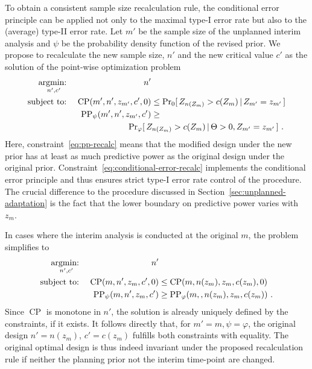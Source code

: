 \documentclass{article}
\renewcommand{\Pr}{\operatorname{Pr}}
\newcommand{\st}{\operatorname{subject\ to:\ }}
\newcommand{\argmin}[1]{\operatornamewithlimits{argmin:\ }_{#1}}
\newcommand{\CP}{\ensuremath{\operatorname{CP}}}
\newcommand{\PP}{\ensuremath{\operatorname{PP}}}
\renewcommand{\Pr}{\ensuremath{\operatorname{Pr}}}
\newcommand{\cond}{\ensuremath{\,|\,}}
\begin{document}
To obtain a consistent sample size recalculation rule, 
the conditional error principle can be applied not only to the
maximal type-I error rate but also to the (average) type-II error rate.
Let $m'$ be the sample size of the unplanned interim analysis and
$\psi$ be the probability density function of the revised prior.
We propose to recalculate the new sample size, $n'$ and 
the new critical value $c'$ as the solution of the point-wise optimization problem 
\begin{align}
    \argmin{n',c'} && n' &\\
     \st && \CP(m', n', z_{m'}, c', 0) &\leq \Pr_0[\,Z_{n(Z_m)} > c(Z_m) \cond Z_{m'} = z_{m'}\,] \label{eq:conditional-error-recalc}\\
     && \PP_\psi(m', n', z_{m'}, c') &\geq \nonumber \\ 
     && & \hspace*{-1cm}\Pr_\varphi[\,Z_{n(Z_m)} > c(Z_m) \cond \Theta >0, Z_{m'} = z_{m'}\,] \label{eq:pp-recalc} \ .
\end{align}
Here, constraint~\eqref{eq:pp-recalc} means that the modified design under the new prior has at least as much predictive power as the original design under the original prior. 
Constraint~\eqref{eq:conditional-error-recalc} implements the conditional error principle and thus ensures strict type-I error rate control of the 
procedure. 
The crucial difference to the procedure discussed in Section~\ref{sec:unplanned-adaptation} is the fact that the lower boundary on predictive power varies with $z_m$.

In cases where the interim analysis is conducted at the original $m$, 
the problem simplifies to
\begin{align}
    \argmin{n',c'} && n' & \label{eq:objective-original-interim}\\
    \st 
    && \CP(m, n', z_{m}, c', 0) &\leq \CP(m, n(z_m), z_{m}, c(z_m), 0) \\
    && \PP_\psi(m, n', z_{m}, c') &\geq \PP_\varphi(m, , n(z_m), z_{m}, c(z_m))  \label{eq:pp-original-interim} \ .
\end{align}
Since $\CP$ is monotone in $n'$, the solution is already uniquely 
defined by the constraints, if it exists.
It follows directly that, for $m'=m, \psi=\varphi$, 
the original design ${n'=n(z_{m})}$, ${c'=c(z_m)}$ fulfills both constraints with equality.
The original optimal design is thus indeed invariant under the 
proposed recalculation rule if neither the planning prior not the interim time-point are changed.
\end{document}
